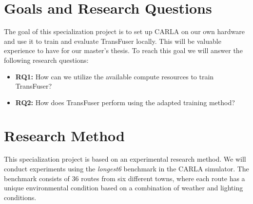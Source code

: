 \section{Goals and Research Questions}
The goal of this specialization project is to set up CARLA on our own hardware and use it to train and evaluate TransFuser locally. This will be valuable experience to have for our master's thesis. To reach this goal we will answer the following research questions:
\begin{itemize}

    \item \textbf{RQ1:} How can we utilize the available compute resources to train TransFuser?
    \item \textbf{RQ2:} How does TransFuser perform using the adapted training method?
\end{itemize}

\begin{comment}
gammelt:
\begin{itemize}    
    \item \textbf{RQ1:} Hva er state-of-the-art (i et simulert miljø / i CARLA)?
    \item \textbf{RQ2:} Kan vi gjenskape state-of-the-art i CARLA?
    \item \textbf{RQ?:} Hvordan sette opp CARLA i IDUN(?)
    \item \textbf{RQ?:} Can we evaluate the TransFuser model using their pre-trained weights?
    \item \textbf{RQ?:} Can we evaluate the TransFuser model using our re-trained weights?
\end{itemize}    
\end{comment}


\section{Research Method}
This specialization project is based on an experimental research method. We will conduct experiments using the \textit{longest6} benchmark in the CARLA simulator. The benchmark consists of 36 routes from six different towns, where each route has a unique environmental condition based on a combination of weather and lighting conditions.

